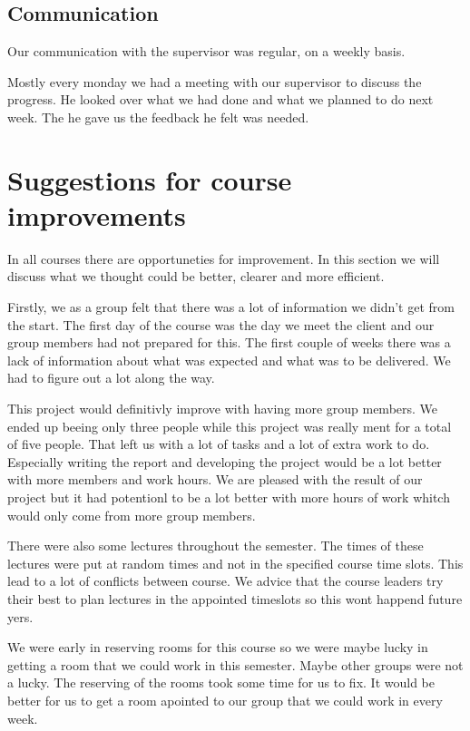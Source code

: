 \subsection{Communication}
Our communication with the supervisor was regular, on a weekly basis.

Mostly every monday we had a meeting with our supervisor to discuss the progress.
He looked over what we had done and what we planned to do next week.
The he gave us the feedback he felt was needed.


\section{Suggestions for course improvements}
In all courses there are opportuneties for improvement.
In this section we will discuss what we thought could be better, clearer and more efficient.

Firstly, we as a group felt that there was a lot of information we didn't get from the start. 
The first day of the course was the day we meet the client and our group members had not prepared for this.
The first couple of weeks there was a lack of information about what was expected and what was to be delivered.
We had to figure out a lot along the way.

This project would definitivly improve with having more group members. 
We ended up beeing only three people while this project was really ment for a total of five people.
That left us with a lot of tasks and a lot of extra work to do.
Especially writing the report and developing the project would be a lot better with more members and work hours. 
We are pleased with the result of our project but it had potentionl to be a lot better with more hours of work whitch would only come from more group members. 

There were also some lectures throughout the semester. The times of these lectures were put at random times and not in the specified course time slots.
This lead to a lot of conflicts between course.
We advice that the course leaders try their best to plan lectures in the appointed timeslots so this wont happend future yers. 

We were early in reserving rooms for this course so we were maybe lucky in getting a room that we could work in this semester. Maybe other groups were not a lucky. 
The reserving of the rooms took some time for us to fix. 
It would be better for us to get a room apointed to our group that we could work in every week. 

